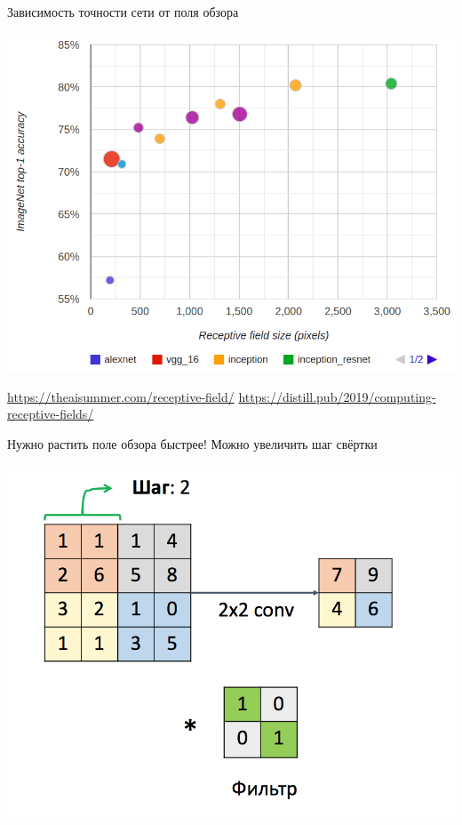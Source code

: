 \documentclass[notes,12pt, aspectratio=169]{beamer}
\begin{document}
\begin{frame}{Зависимость точности сети от поля обзора}
\begin{center}
	\includegraphics[width=.57\linewidth]{imagenet-classification-and-receptive-field.png}
\end{center}
\vfill %
\footnotesize
\color{blue} \url{https://theaisummer.com/receptive-field/} \newline 
\color{blue} \url{https://distill.pub/2019/computing-receptive-fields/}
\end{frame}



\begin{frame}{Нужно растить поле обзора быстрее!}
\vspace{5mm}
\alert{Можно увеличить шаг свёртки}
	\begin{center}
		\includegraphics[width=.55\linewidth]{stride_01.png}
	\end{center}
\end{frame}
\end{document}
